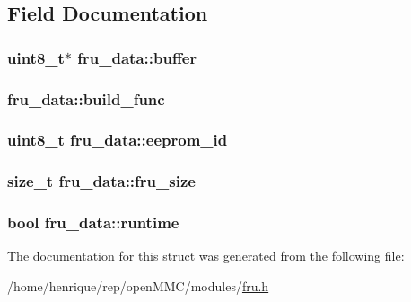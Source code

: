 \subsection{Field Documentation}
\hypertarget{structfru__data_a62eb17a5914f49b64f89c344238ded19}{
\subsubsection[{buffer}]{\setlength{\rightskip}{0pt plus 5cm}uint8\-\_\-t$\ast$ fru\-\_\-data\-::buffer}}\label{structfru__data_a62eb17a5914f49b64f89c344238ded19}
\hypertarget{structfru__data_aced842ec141d2d3379f10400c0a7e3ca}{
\subsubsection[{build\-\_\-func}]{ fru\-\_\-data\-::build\-\_\-func}}\label{structfru__data_aced842ec141d2d3379f10400c0a7e3ca}
\hypertarget{structfru__data_a401009b7d19c3d5e104b2708001f57e4}{
\subsubsection[{eeprom\-\_\-id}]{\setlength{\rightskip}{0pt plus 5cm}uint8\-\_\-t fru\-\_\-data\-::eeprom\-\_\-id}}\label{structfru__data_a401009b7d19c3d5e104b2708001f57e4}
\hypertarget{structfru__data_a5970b89059e93866e0f0bbd83bdc4081}{
\subsubsection[{fru\-\_\-size}]{\setlength{\rightskip}{0pt plus 5cm}size\-\_\-t fru\-\_\-data\-::fru\-\_\-size}}\label{structfru__data_a5970b89059e93866e0f0bbd83bdc4081}
\hypertarget{structfru__data_a147c5c360743fb7ac5dc665559c3cd35}{
\subsubsection[{runtime}]{\setlength{\rightskip}{0pt plus 5cm}bool fru\-\_\-data\-::runtime}}\label{structfru__data_a147c5c360743fb7ac5dc665559c3cd35}


The documentation for this struct was generated from the following file\-:\begin{DoxyCompactItemize}
\item 
/home/henrique/rep/open\-M\-M\-C/modules/\hyperlink{fru_8h}{fru.\-h}\end{DoxyCompactItemize}
